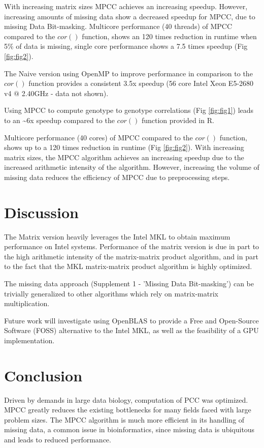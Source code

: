 \documentclass{bioinfo}
\begin{document}
With increasing matrix sizes  MPCC achieves an increasing speedup. However, 
increasing amounts of missing data show a decreased speedup for MPCC, due 
to missing Data Bit-masking. Multicore performance (40 threads) of MPCC 
compared to the $cor()$ function, shows an 120 times reduction in runtime 
when 5\% of data is missing, single core performance shows a 7.5 times 
speedup (Fig \ref{fig:fig2}). 

The Naive version using OpenMP to improve performance in comparison to the 
$cor()$ function provides a consistent 3.5x speedup (56 core Intel Xeon E5-2680 
v4 $@$ 2.40GHz - data not shown).

Using MPCC to compute genotype to genotype correlations (Fig \ref{fig:fig1}) leads to 
an \textasciitilde{}6x speedup compared to the $cor()$ function provided in R.

Multicore performance (40 cores) of MPCC compared to the $cor()$ function, shows up to a 
120 times reduction in runtime (Fig \ref{fig:fig2}). With increasing matrix sizes, 
the MPCC algorithm achieves an increasing speedup due to the increased arithmetic 
intensity of the algorithm. However, increasing the volume of missing data reduces the 
efficiency of MPCC due to preprocessing steps.

\vspace*{-5mm}
\section{Discussion}
The Matrix version heavily leverages the Intel\textregistered{} MKL to obtain 
maximum performance on Intel\textregistered{} systems. Performance of the 
matrix version is due in part to the high arithmetic intensity of the 
matrix-matrix product algorithm, and in part to the fact that the MKL 
matrix-matrix product algorithm is highly optimized.  

The missing data approach (Supplement 1 - 'Missing Data Bit-masking') can be 
trivially generalized to other algorithms which rely on matrix-matrix multiplication.

Future work will investigate using OpenBLAS to provide a Free and Open-Source 
Software (FOSS) alternative to the Intel\textregistered{} MKL, as well as the 
feasibility of a GPU implementation.
\vspace*{-5mm}
\section{Conclusion}
Driven by demands in large data biology, computation of PCC was optimized. 
MPCC greatly reduces the existing bottlenecks for many fields faced with 
large problem sizes. The MPCC algorithm is much more efficient in its handling 
of missing data, a common issue in bioinformatics, since missing data is 
ubiquitous and leads to reduced performance.
\end{document}
